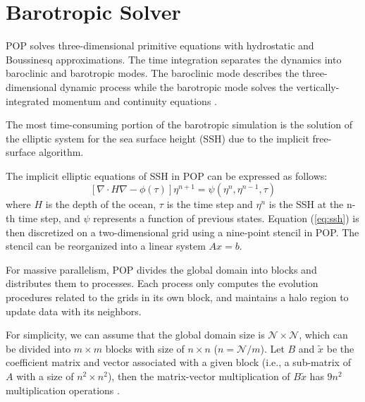 \section{Barotropic Solver} \label{se:baro}
POP solves three-dimensional primitive equations with hydrostatic and Boussinesq approximations.
The time integration separates the dynamics into baroclinic and barotropic modes.
The baroclinic mode describes the three-dimensional dynamic process while
the barotropic mode solves the vertically-integrated momentum and continuity equations \cite{smith2010parallel}.

The most time-consuming portion of the barotropic simulation is the solution of the elliptic system for the sea surface height (SSH)
due to the implicit free-surface algorithm\cite{pop05}. 

The implicit elliptic equations of SSH in POP can be expressed as follows:
\begin{equation}
\label{eq:ssh}
[\nabla \cdot H\nabla  -\phi(\tau)]\eta^{n+1} = \psi(\eta^n,\eta^{n-1},\tau)
\end{equation}
where $H$ is the depth of the ocean, $\tau$ is the time step  and $\eta^n$ is the SSH at the n-th time step, and $\psi$ represents a function of previous states.
Equation (\ref{eq:ssh}) is then discretized on a two-dimensional grid using a nine-point stencil in POP. The stencil can be reorganized into a linear system $Ax =b$.

For massive parallelism, POP divides the global domain into blocks and distributes them to processes. 
Each process only computes the evolution procedures related to the grids in its own block, and maintains a halo region to update data with its neighbors.


For simplicity, we can assume that the global domain size is $\mathcal{N}\times \mathcal{N}$,
which can be divided into $m\times m$ blocks with size of $n\times n$ ($n=\mathcal{N}/m$). 
Let $B$ and $\tilde{x}$ be the coefficient matrix and vector associated with a given block (i.e., a sub-matrix of $A$ with a size of $n^2\times n^2$),
then the matrix-vector multiplication of $B\tilde{x}$ has $9n^2$ multiplication operations \cite{hu2013scalable}.
